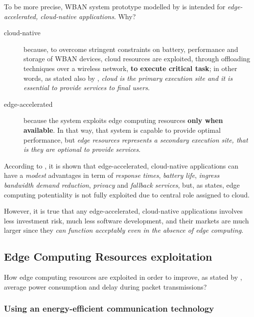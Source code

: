 \documentclass[sigchi]{acmart}
\begin{document}
To be more precise, WBAN system prototype modelled by \citet{MSAReport} is intended for \textit{edge-accelerated, cloud-native applications}. Why?

\begin{description}

\item[cloud-native] because, to overcome stringent constraints on battery, performance and storage of WBAN devices, cloud resources are exploited, through offloading techniques over a wireless network, \textbf{to execute critical task}; in other words, as stated also by \citet{MSAReport}, \textit{cloud is the primary execution site and it is essential to provide services to final users}.

\item[edge-accelerated] because the system exploits edge computing resources \textbf{only when available}. In that way, that system is capable to provide optimal performance, but \textit{edge resources represents a secondary execution site, that is they are optional to provide services}.

\end{description}

According to \citet{TheSeminalRoleEdgeNativeApplications}, it is shown that edge-accelerated, cloud-native applications can have a \textit{modest} advantages in term of \textit{response times}, \textit{battery life}, \textit{ingress bandwidth demand reduction}, \textit{privacy} and \textit{fallback services}\cite{TheSeminalRoleEdgeNativeApplications}\citep{TheEmergenceOfEdgeComputing}, but, as \citet{TheSeminalRoleEdgeNativeApplications} states, edge computing potentiality is not fully exploited due to central role assigned to cloud.

However, it is true that any edge-accelerated, cloud-native applications involves less investment risk, much less software development, and their markets are much larger since they \textit{can function acceptably even in the absence of edge computing}.

\subsection{Edge Computing Resources exploitation}

How edge computing resources are exploited in order to improve, as stated by \citet{MSAReport}, average power consumption and delay during packet transmissions? 

\subsubsection{Using an energy-efficient communication technology}
\end{document}
